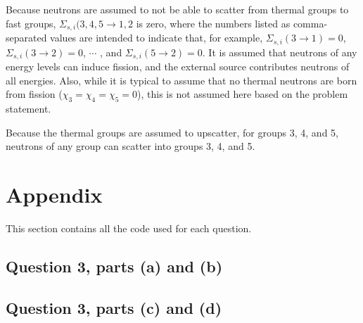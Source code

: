 \documentclass[10pt]{article}
\begin{document}
Because neutrons are assumed to not be able to scatter from thermal groups to fast groups, \(\Sigma_{s,i}(3,4,5\rightarrow 1,2\) is zero, where the numbers listed as comma-separated values are intended to indicate that, for example, \(\Sigma_{s,i}(3\rightarrow 1)=0\), \(\Sigma_{s,i}(3\rightarrow 2)=0\), \(\cdots\) , and \(\Sigma_{s,i}(5\rightarrow2)=0\). It is assumed that neutrons of any energy levels can induce fission, and the external source contributes neutrons of all energies. Also, while it is typical to assume that no thermal neutrons are born from fission (\(\chi_3=\chi_4=\chi_5=0\)), this is not assumed here based on the problem statement.

Because the thermal groups are assumed to upscatter, for groups 3, 4, and 5, neutrons of any group can scatter into groups 3, 4, and 5.

\section{Appendix}
This section contains all the code used for each question. 

\subsection{Question 3, parts (a) and (b)}


\subsection{Question 3, parts (c) and (d)}

\end{document}
